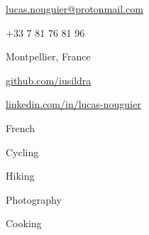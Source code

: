 \documentclass[11pt]{spidercv}
\begin{document}
\begin{TopBar}{\ColorTextSide}

  \vspace{-0.7cm}
  \begin{multicols}{2}
    \begin{ItemList}{\ColorHighlight}
      \item [\Large\faAt]\href{mailto:lucas.nouguier@protonmail.com}{lucas.nouguier@protonmail.com}
      \item [\Large\faPhone] +33 7 81 76 81 96
      \item [\Large\faHome] Montpellier, France
      \columnbreak
      \item [\Large\faGithub] \href{https://github.com/iusildra}{github.com/iusildra}
      \item [\Large\faLinkedinSquare] \href{https://www.linkedin.com/in/lucas-nouguier/}{linkedin.com/in/lucas-nouguier}
      \item [\Large\faLanguage] French
    \end{ItemList}
  \end{multicols}

  \vspace{-0.4cm}
  \vspace{-0.7cm}
  \begin{multicols}{4}
    \begin{ItemList}{\ColorHighlight}
      \item [] Cycling
      \item [] Hiking
      \item [] Photography
      \item [] Cooking
    \end{ItemList}
  \end{multicols}
\end{TopBar}
\end{document}
